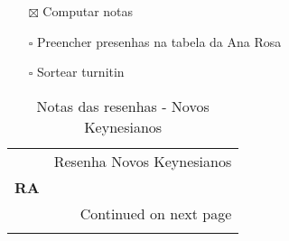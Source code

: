 \documentclass[11pt]{article}
\begin{document}
\begin{itemize}
\item[{$\boxtimes$}] Computar notas
\item[{$\square$}] Preencher presenhas na tabela da Ana Rosa
\item[{$\square$}] Sortear turnitin
\end{itemize}
\begin{center}
\begin{longtable}{lr}
\caption{Notas das resenhas - Novos Keynesianos}\\
\toprule
{} &  Resenha Novos Keynesianos \\
\textbf{RA    } &                            \\
\midrule
\endhead
\midrule
\multicolumn{2}{r}{{Continued on next page}} \\
\midrule
\endfoot


\end{longtable}
\end{center}
\end{document}
